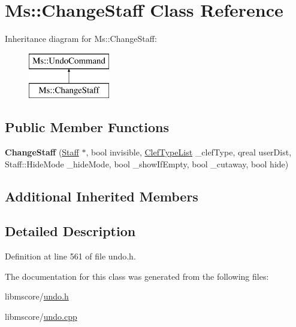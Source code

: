 \hypertarget{class_ms_1_1_change_staff}{}\section{Ms\+:\+:Change\+Staff Class Reference}
\label{class_ms_1_1_change_staff}
Inheritance diagram for Ms\+:\+:Change\+Staff\+:\begin{figure}[H]
\begin{center}
\leavevmode
\includegraphics[height=2.000000cm]{class_ms_1_1_change_staff}
\end{center}
\end{figure}
\subsection*{Public Member Functions}
\begin{DoxyCompactItemize}
\item 
\mbox{\label{class_ms_1_1_change_staff_a16412c97633b0e5c8e7273b6ecbf1161}} 
{\bfseries Change\+Staff} (\hyperlink{class_ms_1_1_staff}{Staff} $\ast$, bool invisible, \hyperlink{struct_ms_1_1_clef_type_list}{Clef\+Type\+List} \+\_\+clef\+Type, qreal user\+Dist, Staff\+::\+Hide\+Mode \+\_\+hide\+Mode, bool \+\_\+show\+If\+Empty, bool \+\_\+cutaway, bool hide)
\end{DoxyCompactItemize}
\subsection*{Additional Inherited Members}


\subsection{Detailed Description}


Definition at line 561 of file undo.\+h.



The documentation for this class was generated from the following files\+:\begin{DoxyCompactItemize}
\item 
libmscore/\hyperlink{undo_8h}{undo.\+h}\item 
libmscore/\hyperlink{undo_8cpp}{undo.\+cpp}\end{DoxyCompactItemize}
